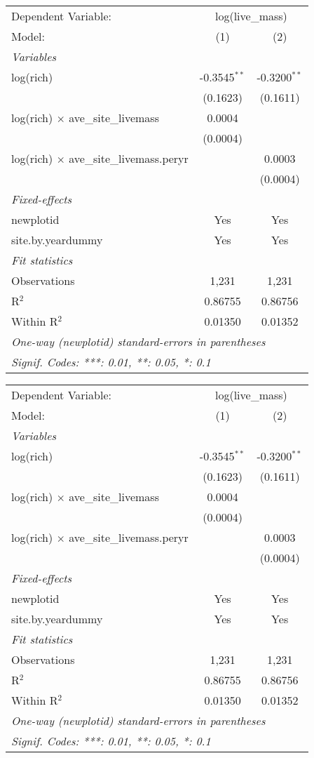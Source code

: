 \begin{tabular}{lcc}
\tabularnewline\midrule\midrule
Dependent Variable:&\multicolumn{2}{c}{log(live\_mass)}\\
Model:&(1) & (2)\\
\midrule \emph{Variables}&   &  \\
log(rich)&-0.3545$^{**}$ & -0.3200$^{**}$\\
  &(0.1623) & (0.1611)\\
log(rich) $\times $ ave\_site\_livemass&0.0004 &   \\
  &(0.0004) &   \\
log(rich) $\times $ ave\_site\_livemass.peryr&   & 0.0003\\
  &   & (0.0004)\\
\midrule \emph{Fixed-effects}&   &  \\
newplotid & Yes & Yes\\
site.by.yeardummy & Yes & Yes\\
\midrule \emph{Fit statistics}&  & \\
Observations & 1,231&1,231\\
R$^2$ & 0.86755&0.86756\\
Within R$^2$ & 0.01350&0.01352\\
\midrule\midrule\multicolumn{3}{l}{\emph{One-way (newplotid) standard-errors in parentheses}}\\
\multicolumn{3}{l}{\emph{Signif. Codes: ***: 0.01, **: 0.05, *: 0.1}}\\
\end{tabular}


\begin{tabular}{lcc}
\tabularnewline\midrule\midrule
Dependent Variable:&\multicolumn{2}{c}{log(live\_mass)}\\
Model:&(1) & (2)\\
\midrule \emph{Variables}&   &  \\
log(rich)&-0.3545$^{**}$ & -0.3200$^{**}$\\
  &(0.1623) & (0.1611)\\
log(rich) $\times $ ave\_site\_livemass&0.0004 &   \\
  &(0.0004) &   \\
log(rich) $\times $ ave\_site\_livemass.peryr&   & 0.0003\\
  &   & (0.0004)\\
\midrule \emph{Fixed-effects}&   &  \\
newplotid & Yes & Yes\\
site.by.yeardummy & Yes & Yes\\
\midrule \emph{Fit statistics}&  & \\
Observations & 1,231&1,231\\
R$^2$ & 0.86755&0.86756\\
Within R$^2$ & 0.01350&0.01352\\
\midrule\midrule\multicolumn{3}{l}{\emph{One-way (newplotid) standard-errors in parentheses}}\\
\multicolumn{3}{l}{\emph{Signif. Codes: ***: 0.01, **: 0.05, *: 0.1}}\\
\end{tabular}


